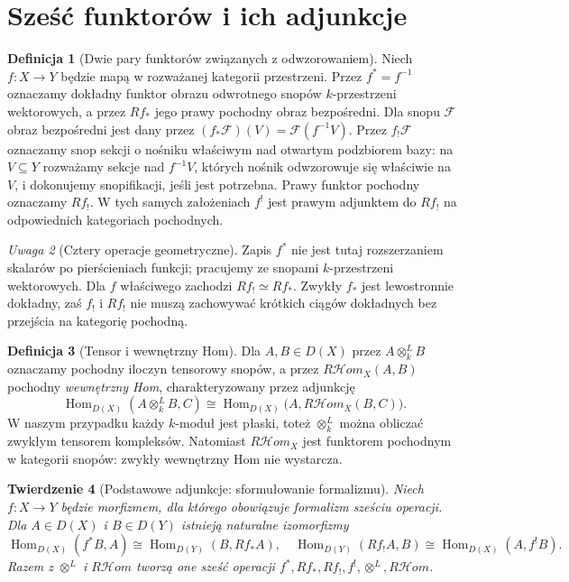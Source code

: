 \documentclass[11pt,a4paper,oneside]{report}
\theoremstyle{plain}
\newtheorem{twierdzenie}{Twierdzenie}[section]
\theoremstyle{definition}
\newtheorem{definicja}[twierdzenie]{Definicja}
\theoremstyle{remark}
\newtheorem{uwaga}[twierdzenie]{Uwaga}
\begin{document}
\section{Sześć funktorów i ich adjunkcje}
\begin{definicja}[Dwie pary funktorów związanych z odwzorowaniem]
Niech $f:X\to Y$ będzie mapą w rozważanej kategorii przestrzeni.
Przez $f^*=f^{-1}$ oznaczamy dokładny funktor obrazu odwrotnego
snopów $k$-przestrzeni wektorowych, a przez $Rf_*$ jego prawy
pochodny obraz bezpośredni. Dla snopu $\mathcal F$ obraz bezpośredni
jest dany przez $(f_*\mathcal F)(V)=\mathcal F(f^{-1}V)$.
Przez $f_!\mathcal F$ oznaczamy snop sekcji o nośniku właściwym
nad otwartym podzbiorem bazy: na $V\subseteq Y$ rozważamy
sekcje nad $f^{-1}V$, których nośnik odwzorowuje się właściwie na $V$,
i dokonujemy snopifikacji, jeśli jest potrzebna. Prawy funktor
pochodny oznaczamy $Rf_!$. W tych samych założeniach $f^!$
jest prawym adjunktem do $Rf_!$ na odpowiednich kategoriach
pochodnych.
\end{definicja}
\begin{uwaga}[Cztery operacje geometryczne]
Zapis $f^*$ nie jest tutaj rozszerzaniem skalarów po pierścieniach
funkcji; pracujemy ze snopami $k$-przestrzeni wektorowych.
Dla $f$ właściwego zachodzi $Rf_!\simeq Rf_*$. Zwykły
$f_*$ jest lewostronnie dokładny, zaś $f_!$ i $Rf_!$
nie muszą zachowywać krótkich ciągów dokładnych bez przejścia
na kategorię pochodną.
\end{uwaga}
\begin{definicja}[Tensor i wewnętrzny Hom]
Dla $A,B\in D(X)$ przez $A\otimes_k^L B$ oznaczamy
pochodny iloczyn tensorowy snopów, a przez
$R\mathcal Hom_X(A,B)$ pochodny \emph{wewnętrzny Hom},
charakteryzowany przez adjunkcję
\[
\operatorname{Hom}_{D(X)}(A\otimes_k^L B,C)
\cong\operatorname{Hom}_{D(X)}
\bigl(A,R\mathcal Hom_X(B,C)\bigr).
\]
W naszym przypadku każdy $k$-moduł jest płaski, toteż
$\otimes_k^L$ można obliczać zwykłym tensorem kompleksów.
Natomiast $R\mathcal Hom_X$ jest funktorem pochodnym w kategorii
snopów: zwykły wewnętrzny Hom nie wystarcza.
\end{definicja}
\begin{twierdzenie}[Podstawowe adjunkcje: sformułowanie formalizmu]
\label{thm:xvi-adjunctions}
Niech $f:X\to Y$ będzie morfizmem, dla którego obowiązuje
formalizm sześciu operacji. Dla $A\in D(X)$ i $B\in D(Y)$
istnieją naturalne izomorfizmy
\[
\operatorname{Hom}_{D(X)}(f^*B,A)
\cong\operatorname{Hom}_{D(Y)}(B,Rf_*A),
\quad
\operatorname{Hom}_{D(Y)}(Rf_!A,B)
\cong\operatorname{Hom}_{D(X)}(A,f^!B).
\]
Razem z $\otimes^L$ i $R\mathcal Hom$ tworzą one sześć
operacji $f^*,Rf_*,Rf_!,f^!,\otimes^L,R\mathcal Hom$.
\end{twierdzenie}
\end{document}
